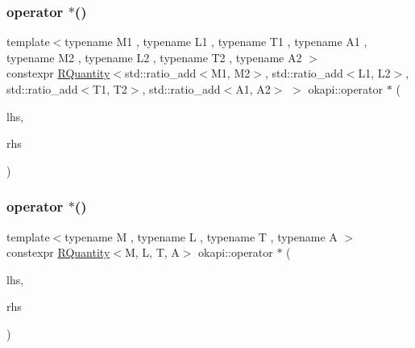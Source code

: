 \subsubsection{\texorpdfstring{operator $\ast$()}{operator *()}\hspace{0.1cm}{\footnotesize\ttfamily [1/4]}}
{\footnotesize\ttfamily template$<$typename M1 , typename L1 , typename T1 , typename A1 , typename M2 , typename L2 , typename T2 , typename A2 $>$ \\
constexpr \mbox{\hyperlink{classokapi_1_1RQuantity}{R\+Quantity}}$<$std\+::ratio\+\_\+add$<$M1, M2$>$, std\+::ratio\+\_\+add$<$L1, L2$>$, std\+::ratio\+\_\+add$<$T1, T2$>$, std\+::ratio\+\_\+add$<$A1, A2$>$ $>$ okapi\+::operator $\ast$ (\begin{DoxyParamCaption}\item[{const \mbox{\hyperlink{classokapi_1_1RQuantity}{R\+Quantity}}$<$ M1, L1, T1, A1 $>$ \&}]{lhs,  }\item[{const \mbox{\hyperlink{classokapi_1_1RQuantity}{R\+Quantity}}$<$ M2, L2, T2, A2 $>$ \&}]{rhs }\end{DoxyParamCaption})}

\mbox{\label{namespaceokapi_a2ff902d0db2898d581528d1aa92f7005}} 
\subsubsection{\texorpdfstring{operator $\ast$()}{operator *()}\hspace{0.1cm}{\footnotesize\ttfamily [2/4]}}
{\footnotesize\ttfamily template$<$typename M , typename L , typename T , typename A $>$ \\
constexpr \mbox{\hyperlink{classokapi_1_1RQuantity}{R\+Quantity}}$<$M, L, T, A$>$ okapi\+::operator $\ast$ (\begin{DoxyParamCaption}\item[{const double \&}]{lhs,  }\item[{const \mbox{\hyperlink{classokapi_1_1RQuantity}{R\+Quantity}}$<$ M, L, T, A $>$ \&}]{rhs }\end{DoxyParamCaption})}

\mbox{\label{namespaceokapi_a763b1c8386a8cb4e0cb5f1174e8d91ae}} 

